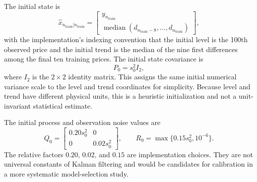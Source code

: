 \documentclass[12pt,a4paper,oneside]{report}
\numberwithin{equation}{chapter}
\numberwithin{figure}{chapter}
\numberwithin{table}{chapter}
\theoremstyle{definition}
\theoremstyle{plain}
\newcommand{\1}{\mathbf{1}}
\newcommand{\hatt}[1]{\widehat{#1}}
\begin{document}
The initial state is
\begin{equation}
  \hatt{x}_{n_{\mathrm{train}}|n_{\mathrm{train}}}
  =\begin{bmatrix}y_{n_{\mathrm{train}}}\\
  \operatorname{median}(d_{n_{\mathrm{train}}-8},\ldots,d_{n_{\mathrm{train}}})\end{bmatrix},
  \label{eq:initstate}
\end{equation}
with the implementation's indexing convention that the initial level is the 100th observed price and the initial trend is the median of the nine first differences among the final ten training prices. The initial state covariance is
\begin{equation}
  P_0=s_0^2I_2,
  \label{eq:initP}
\end{equation}
where $I_2$ is the $2\times2$ identity matrix. This assigns the same initial numerical variance scale to the level and trend coordinates for simplicity. Because level and trend have different physical units, this is a heuristic initialization and not a unit-invariant statistical estimate.

The initial process and observation noise values are
\begin{equation}
  Q_0=\begin{bmatrix}0.20s_0^2&0\\0&0.02s_0^2\end{bmatrix},
  \qquad R_0=\max\{0.15s_0^2,10^{-6}\}.
  \label{eq:initQR}
\end{equation}
The relative factors $0.20$, $0.02$, and $0.15$ are implementation choices. They are not universal constants of Kalman filtering and would be candidates for calibration in a more systematic model-selection study.
\end{document}
